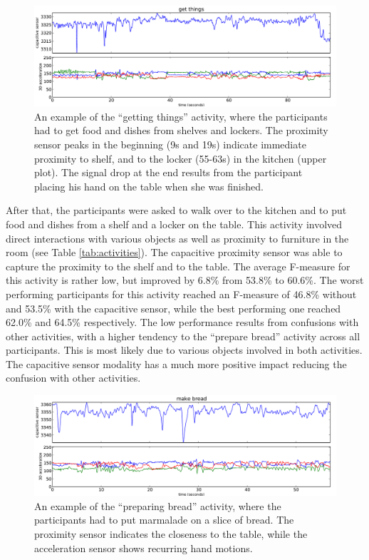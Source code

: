 \documentclass[runningheads,a4paper]{llncs}
\begin{document}
\begin{figure}
	\centering
		\includegraphics[width=\textwidth]{../Auswertung/images/tobias_4.pdf}
	\caption{An example of the ``getting things'' activity, where the participants had to get food and dishes from shelves and lockers. The proximity sensor peaks in the beginning (9s and 19s) indicate immediate proximity to shelf, and to the locker (55-63s) in the kitchen (upper plot). The signal drop at the end results from the participant placing his hand on the table when she was finished.}
	\label{fig:get_things}
\end{figure}

After that, the participants were asked to walk over to the kitchen and to put food and dishes from a shelf and a locker on the table. This activity involved direct interactions with various objects as well as proximity to furniture in the room (see Table \ref{tab:activities}). The capacitive proximity sensor was able to capture the proximity to the shelf and to the table. The average F-measure for this activity is rather low, but improved by 6.8\% from 53.8\% to 60.6\%. 
The worst performing participants for this activity reached an F-measure of 46.8\% without and 53.5\% with the capacitive sensor, while the best performing one reached 62.0\% and 64.5\% respectively. The low performance results from confusions with other activities, with a higher tendency to the ``prepare bread'' activity across all participants. This is most likely due to various objects involved in both activities. The capacitive sensor modality has a much more positive impact reducing the confusion with other activities.

\begin{figure}
	\centering
		\includegraphics[width=\textwidth]{../Auswertung/images/eugen_5.pdf}
	\caption{An example of the ``preparing bread'' activity, where the participants had to put marmalade on a slice of bread. The proximity sensor indicates the closeness to the table, while the acceleration sensor shows recurring hand motions.}
	\label{fig:prep_bread}
\end{figure}
\end{document}
